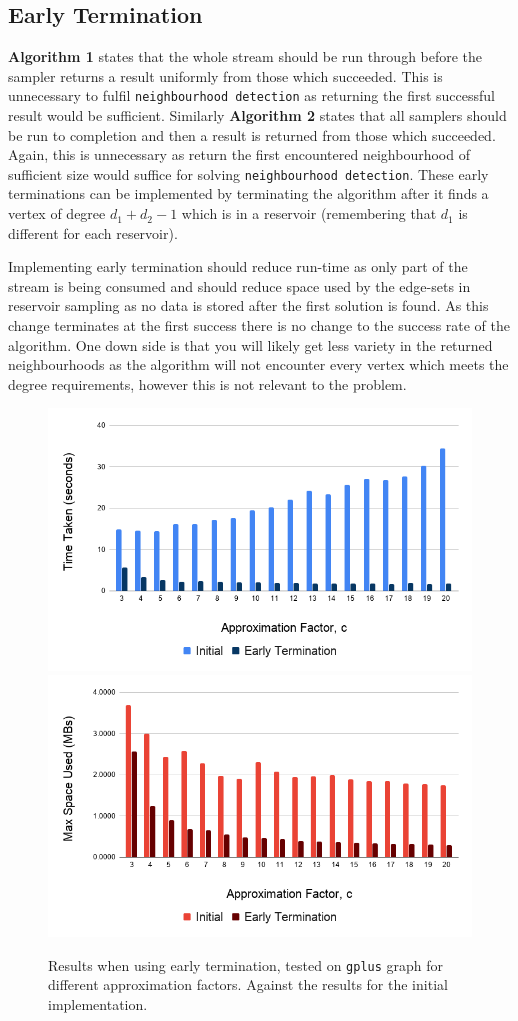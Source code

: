 \documentclass[11pt,twoside,a4paper]{report}
\begin{document}
\subsection{Early Termination}

\textbf{Algorithm 1} states that the whole stream should be run through before the sampler returns a result uniformly from those which succeeded. This is unnecessary to fulfil \texttt{neighbourhood detection} as returning the first successful result would be sufficient. Similarly \textbf{Algorithm 2} states that all samplers should be run to completion and then a result is returned from those which succeeded. Again, this is unnecessary as return the first encountered neighbourhood of sufficient size would suffice for solving \texttt{neighbourhood detection}. These early terminations can be implemented by terminating the algorithm after it finds a vertex of degree $d_1+d_2-1$ which is in a reservoir (remembering that $d_1$ is different for each reservoir).

\par Implementing early termination should reduce run-time as only part of the stream is being consumed and should reduce space used by the edge-sets in reservoir sampling as no data is stored after the first solution is found. As this change terminates at the first success there is no change to the success rate of the algorithm. One down side is that you will likely get less variety in the returned neighbourhoods as the algorithm will not encounter every vertex which meets the degree requirements, however this is not relevant to the problem.

\begin{figure}[H]
	\label{Figure 3}
	\includegraphics[width=.5\textwidth]{img/gplusEarlyTerminationTime.png}
	\includegraphics[width=.5\textwidth]{img/gplusEarlyTerminationSpace.png}
	\caption{Results when using early termination, tested on \texttt{gplus} graph for different approximation factors. Against the results for the initial implementation.}
\end{figure}
\end{document}
